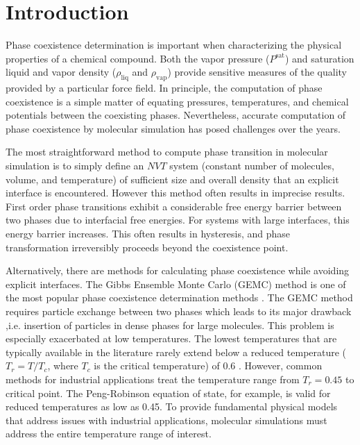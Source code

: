 \documentclass[%
 aip,
 jcp,
 sd,%
 amsmath,amssymb,
 reprint,%
]{revtex4-1}
\begin{document}
\section{Introduction} \label{sec:introduction}
Phase coexistence determination is important when characterizing the physical properties of a chemical compound. Both the vapor pressure ($P^{\mathrm{sat}}$) and saturation liquid and vapor density ($\rho_{\mathrm{liq}}$ and $\rho_{\mathrm{vap}}$) provide sensitive measures of the quality provided by a particular force field. In principle, the computation of phase coexistence is a simple matter of equating pressures, temperatures, and chemical potentials between the coexisting phases. Nevertheless, accurate computation of phase coexistence by molecular simulation has posed challenges over the years. 

The most straightforward method to compute phase transition in molecular simulation is to simply define an $NVT$ system (constant number of molecules, volume, and temperature) of sufficient size and overall density that an explicit interface is encountered. However this method often results in imprecise results. First order phase transitions exhibit a considerable free energy barrier between two phases due to interfacial free energies. For systems with large interfaces, this energy barrier increases. This often results in hysteresis, and phase transformation irreversibly proceeds beyond the coexistence point. \cite{Frenkel1996} 

Alternatively, there are methods for calculating phase coexistence while avoiding explicit interfaces. The Gibbs Ensemble Monte Carlo (GEMC) method \cite{Panagiotopoulos1987} is one of the most popular phase coexistence determination methods \cite{Paluch2008}.  The GEMC method requires particle exchange between two phases which leads to its major drawback ,i.e. insertion of particles in dense phases for large molecules. This problem is especially exacerbated  at low temperatures. The lowest temperatures that are typically available in the literature rarely extend below a reduced temperature ($T_r = T/T_c$, where $T_c$ is the critical temperature) of 0.6 \cite{Martin1998,Potoff2009}. However, common methods for industrial applications treat the temperature range from $T_r=0.45$ to critical point. The Peng-Robinson equation of state, for example, is valid for reduced temperatures as low as 0.45. \cite{Peng1976} To provide fundamental physical models that address issues with industrial applications, molecular simulations must address the entire temperature range of interest. 
\end{document}
